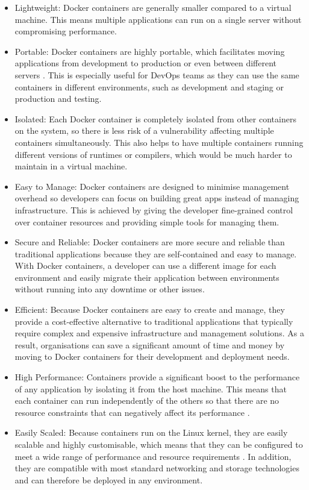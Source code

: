 \documentclass[BIF,Master,nenglish]{twbook}
\begin{document}
\begin{itemize}
\item Lightweight: Docker containers are generally smaller compared to a virtual machine. This means multiple applications can run on a single server without compromising performance.\cite{vmwcovsvm}

\item Portable: Docker containers are highly portable, which facilitates moving applications from development to production or even between different servers \cite{rad2017}. This is especially useful for DevOps teams as they can use the same containers in different environments, such as development and staging or production and testing.

\item Isolated: Each Docker container is completely isolated from other containers on the system, so there is less risk of a vulnerability affecting multiple containers simultaneously.\cite{com2016} This also helps to have multiple containers running different versions of runtimes or compilers, which would be much harder to maintain in a virtual machine.

\item Easy to Manage: Docker containers are designed to minimise management overhead so developers can focus on building great apps instead of managing infrastructure. This is achieved by giving the developer fine-grained control over container resources and providing simple tools for managing them. 

\item Secure and Reliable: Docker containers are more secure and reliable than traditional applications because they are self-contained and easy to manage. With Docker containers, a developer can use a different image for each environment and easily migrate their application between environments without running into any downtime or other issues. 

\item Efficient: Because Docker containers are easy to create and manage, they provide a cost-effective alternative to traditional applications that typically require complex and expensive infrastructure and management solutions. As a result, organisations can save a significant amount of time and money by moving to Docker containers for their development and deployment needs. 

\item High Performance: Containers provide a significant boost to the performance of any application by isolating it from the host machine. This means that each container can run independently of the others so that there are no resource constraints that can negatively affect its performance \cite{rad2017}.

\item Easily Scaled: Because containers run on the Linux kernel, they are easily scalable and highly customisable, which means that they can be configured to meet a wide range of performance and resource requirements \cite{rad2017}. In addition, they are compatible with most standard networking and storage technologies and can therefore be deployed in any environment. 
\end{itemize}
\end{document}
